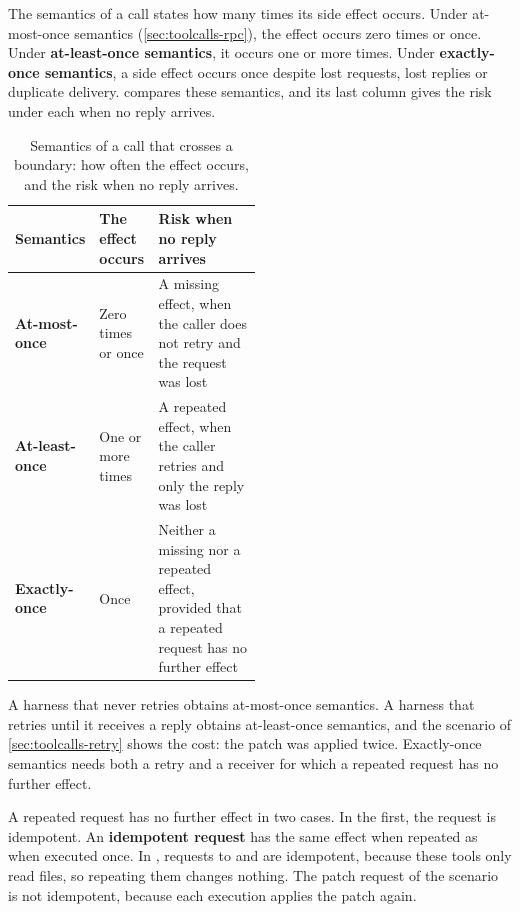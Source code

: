 The semantics of a call states how many times its side effect occurs. Under at-most-once semantics
(\cref{sec:toolcalls-rpc}), the effect occurs zero times or once. Under \textbf{at-least-once
semantics}, it occurs one or more times. Under \textbf{exactly-once semantics}, a side effect occurs
once despite lost requests, lost replies or duplicate delivery. 
compares these semantics, and its last column gives the risk under each when no reply arrives.

\begin{table}[htbp]
  \caption{Semantics of a call that crosses a boundary: how often the effect occurs, and the risk
  when no reply arrives.}
  \label{tab:toolcalls-semantics}
  \begin{adjustbox}{width=\linewidth}\begin{tabularx}{\linewidth}{L{0.25\linewidth}L{0.24\linewidth}X}
    \toprule
    \textbf{Semantics} & \textbf{The effect occurs} & \textbf{Risk when no reply arrives} \\
    \midrule
    \textbf{At-most-once} & Zero times or once & A missing effect, when the caller does not retry
    and the request was lost \\ \addlinespace
    \textbf{At-least-once} & One or more times & A repeated effect, when the caller retries and only
    the reply was lost \\ \addlinespace
    \textbf{Exactly-once} & Once & Neither a missing nor a repeated effect, provided that a repeated
    request has no further effect \\
    \bottomrule
  \end{tabularx}\end{adjustbox}
\end{table}

A harness that never retries obtains at-most-once semantics. A harness that retries until it
receives a reply obtains at-least-once semantics, and the scenario of \cref{sec:toolcalls-retry}
shows the cost: the patch was applied twice. Exactly-once semantics needs both a retry and a
receiver for which a repeated request has no further effect.

A repeated request has no further effect in two cases. In the first, the request is idempotent. An
\textbf{idempotent request} has the same effect when repeated as when executed once. In \msa{},
requests to  and  are idempotent, because these tools only read
files, so repeating them changes nothing. The patch request of the scenario is not idempotent,
because each execution applies the patch again.

